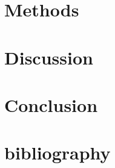 \documentclass[11pt]{article}
\newcommand{\myreferences}{references}
\begin{document}
\section{Methods}
\section{Discussion}
\section{Conclusion}
\section{bibliography}


\end{document}
